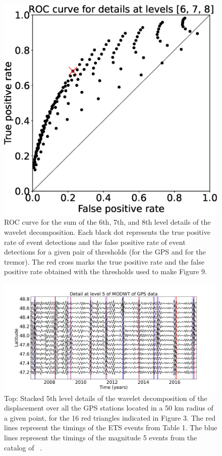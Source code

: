 \documentclass{article}
\begin{document}
\begin{figure}
\noindent\includegraphics[width=\textwidth, trim={0cm 0cm 0cm 0cm},clip]{figures/ROC_6-7-8.eps}
\caption{ROC curve for the sum of the 6th, 7th, and 8th level details of the wavelet decomposition. Each black dot represents the true positive rate of event detections and the false positive rate of event detections for a given pair of thresholds (for the GPS and for the tremor). The red cross marks the true positive rate and the false positive rate obtained with the thresholds used to make Figure 9.}
\label{pngfiguresample}
\end{figure}

\begin{figure}
\noindent\includegraphics[width=\textwidth, trim={0cm 0cm 0cm 0cm},clip]{figures/GPS_michel_detail_5.pdf}
\caption{Top: Stacked 5th level details of the wavelet decomposition of the displacement over all the GPS stations located in a 50 km radius of a given point, for the 16 red triangles indicated in Figure 3. The red lines represent the timings of the ETS events from Table 1. The blue lines represent the timings of the magnitude 5 events from the catalog of ~\citet{MIC_2019}.}
\label{pngfiguresample}
\end{figure}
\end{document}
